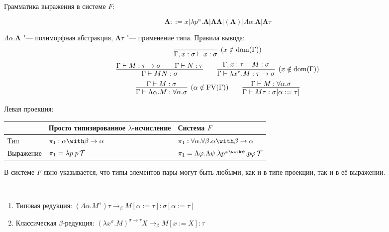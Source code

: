 \begin{definition}[система $F$]
Грамматика выражения в системе $F$:
    \begin{bnf}
    \[
        \mathbf\Lambda ::= x | \lambda p^\alpha . \mathbf\Lambda | \mathbf\Lambda \mathbf\Lambda | (\mathbf\Lambda)
        | \Lambda \alpha . \mathbf\Lambda | \mathbf\Lambda \tau
    \]
    \end{bnf}%
    $\Lambda \alpha . \mathbf\Lambda$ "--- полиморфная абстракция, $\mathbf\Lambda \tau$ "--- применение типа.
    Правила вывода:
    \inferspacing
    \begin{gather*}
        \infer[(x \notin \mathrm{dom}(\Gamma))]{\Gamma, x : \sigma \vdash x : \sigma}{} \\
        \infer{\Gamma \vdash MN : \sigma}{\Gamma \vdash M : \tau \to \sigma && \Gamma \vdash N : \tau} \qquad
        \infer[(x \notin \mathrm{dom}(\Gamma))]
                {\Gamma \vdash \lambda x^\tau . M : \tau \to \sigma}{\Gamma, x : \tau \vdash M : \sigma} \\
        \infer[(\alpha \notin \FV(\Gamma))]{\Gamma \vdash \Lambda \alpha . M : \forall \alpha . \sigma}{\Gamma \vdash M : \sigma} \qquad
        \infer{\Gamma \vdash M \tau : \sigma [\alpha := \tau]}{\Gamma \vdash M : \forall \alpha . \sigma}
    \end{gather*}
\end{definition}

\begin{example} Левая проекция:
    \begin{center}
    \begin{tabular}{l l l} \toprule
        & Просто типизированное $\lambda$-исчисление & Система $F$ \\ \midrule
        Тип & $\pi_1:\alpha\with\beta\to\alpha$ & $\pi_1:\forall \alpha . \forall \beta . \alpha \with \beta \to \alpha$ \\
        Выражение & $\pi_1 = \lambda p . p \operatorname{\mathcal{T}}$ & $\pi_1 = \Lambda \varphi . \Lambda \psi . \lambda p^{\varphi\with\psi} .
                p \varphi \comb T$
        \\ \bottomrule
    \end{tabular}
    \end{center}
В системе $F$ явно указывается, что типы элементов пары могут быть любыми, как и в типе проекции, так и в её выражении.
\end{example}

\begin{definition} \ 
    \begin{enumerate}
        \item Типовая редукция: $\left(\Lambda \alpha . M^\sigma\right) \tau \to_\beta M[\alpha:=\tau] : \sigma[\alpha := \tau]$
        \item Классическая $\beta$-редукция: $\left(\lambda x^\sigma.M\right)^{\sigma\to\tau} X \to_\beta M [x:=X] : \tau$
    \end{enumerate}
\end{definition}

